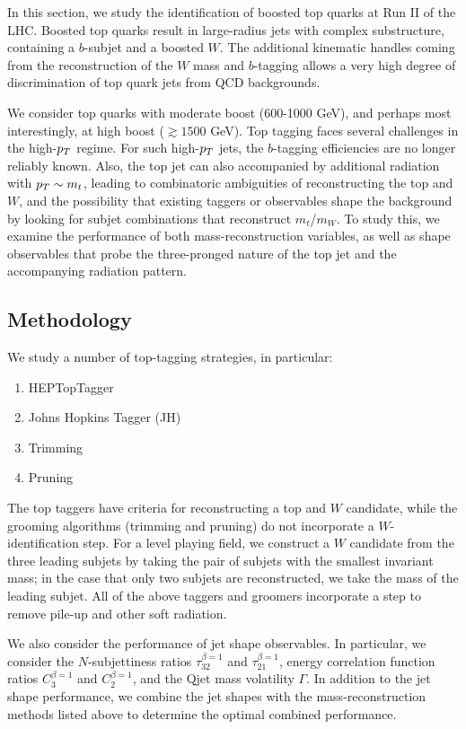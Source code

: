In this section, we study the identification of boosted top quarks at Run II of the LHC. Boosted top quarks result in large-radius jets with complex substructure, containing a $b$-subjet and a boosted $W$. The additional kinematic handles coming from the reconstruction of the $W$ mass and $b$-tagging allows a very high degree of discrimination of top quark jets from QCD backgrounds. 

We consider top quarks with moderate boost (600-1000 GeV), and perhaps most interestingly, at high boost ($\gtrsim1500$ GeV). Top tagging faces several challenges in the high-$p_T$ regime. For such high-$p_T$ jets, the $b$-tagging efficiencies are no longer reliably known. Also, the top jet can also accompanied by additional radiation with $p_T\sim m_t$, leading to combinatoric ambiguities of reconstructing the top and $W$, and the possibility that existing taggers or observables shape the background by looking for subjet combinations that reconstruct $m_t$/$m_W$. To study this, we examine the performance of both mass-reconstruction variables, as well as shape observables that probe the three-pronged nature of the top jet and the accompanying radiation pattern.

\subsection{Methodology}
We study a number of top-tagging strategies, in particular:
%
\begin{enumerate}
\item HEPTopTagger
\item Johns Hopkins Tagger (JH)
\item Trimming
\item Pruning
\end{enumerate}
%
The top taggers have criteria for reconstructing a top and $W$ candidate, while the grooming algorithms (trimming and pruning) do not incorporate a $W$-identification step. For a level playing field, we construct a $W$ candidate from the three leading subjets by taking the pair of subjets with the smallest invariant mass; in the case that only two subjets are reconstructed, we take the mass of the leading subjet. All of the above taggers and groomers incorporate a step to remove pile-up and other soft radiation.

We also consider the performance of jet shape observables. In particular, we consider the $N$-subjettiness ratios $\tau_{32}^{\beta=1}$ and $\tau_{21}^{\beta=1}$, energy correlation function ratios $C_3^{\beta=1}$ and $C_2^{\beta=1}$, and the Qjet mass volatility $\Gamma$. In addition to the jet shape performance, we combine the jet shapes with the mass-reconstruction methods listed above to determine the optimal combined performance.

